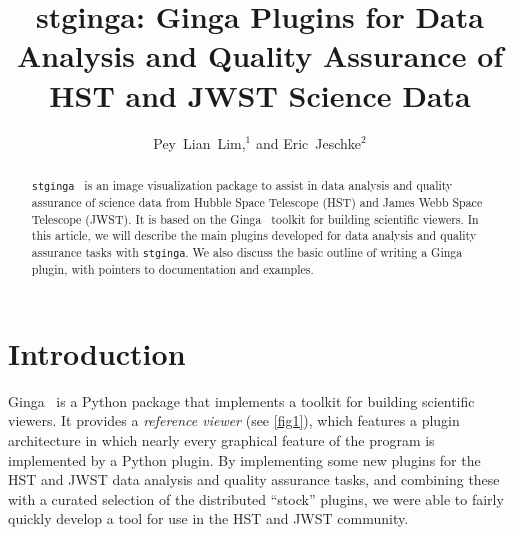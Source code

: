 \documentclass[11pt,twoside]{article}
\begin{document}
\title{stginga: Ginga Plugins for Data Analysis and Quality Assurance of HST and JWST Science Data}

\author{Pey~Lian~Lim,$^1$ and Eric~Jeschke$^2$
  }




\begin{abstract}

{\tt stginga}~\citep{stginga} is an image visualization package to assist
in data analysis and quality assurance of science data from Hubble Space
Telescope (HST) and James Webb Space Telescope (JWST).  It is based on the
Ginga~\citep{ginga} toolkit for building scientific viewers.
In this article, we will describe the main plugins developed for data
analysis and quality assurance tasks with {\tt stginga}.  We also discuss the
basic outline of writing a Ginga plugin, with pointers to documentation
and examples.

\end{abstract}

\section{Introduction}

Ginga~\citep{Jeschke15A} is a Python package that
implements a toolkit for building scientific viewers.  It provides
a \emph{reference viewer} (see \ref{fig1}), which features
a plugin architecture in which nearly every graphical feature of the
program is implemented by a Python plugin.
By implementing some new plugins for the HST and JWST data analysis and
quality assurance tasks, and combining these with a curated selection of
the distributed ``stock'' plugins, we were able to fairly quickly
develop a tool for use in the HST and JWST community.
\end{document}
